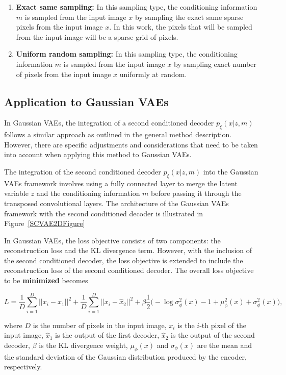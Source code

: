 \begin{enumerate}
    \item \textbf{Exact same sampling:} In this sampling type, the conditioning information $m$ is sampled from the input image $x$ by sampling the exact same sparse pixels from the input image $x$. In this work, the pixels that will be sampled from the input image will be a sparse grid of pixels.
    \item \textbf{Uniform random sampling:} In this sampling type, the conditioning information $m$ is sampled from the input image $x$ by sampling exact number of pixels from the input image $x$ uniformly at random.
\end{enumerate}

\subsection{Application to Gaussian VAEs}

In Gaussian VAEs, the integration of a second conditioned decoder
$p_\xi(x|z,m)$ follows a similar approach as outlined in the general method
description. However, there are specific adjustments and considerations that
need to be taken into account when applying this method to Gaussian VAEs.

The integration of the second conditioned decoder $p_\xi(x|z,m)$ into the
Gaussian VAEs framework involves using a fully connected layer to merge the
latent variable $z$ and the conditioning information $m$ before passing it
through the transposed convolutional layers. The architecture of the Gaussian
VAEs framework with the second conditioned decoder is illustrated in
Figure~\ref{SCVAE2DFigure}

In Gaussian VAEs, the loss objective consists of two components: the
reconstruction loss and the KL divergence term. However, with the inclusion of
the second conditioned decoder, the loss objective is extended to include the
reconstruction loss of the second conditioned decoder. The overall loss
objective to be \textbf{minimized} becomes

\[ L = \frac{1}{D} \sum_{i=1}^{D} ||x_i - \hat{x}_1 ||^2 + \frac{1}{D} \sum_{i=1}^{D} || x_i - \hat{x}_2 ||^2 + \beta  \frac{1}{2} \biggl( -\log \sigma^2_\phi(x) - 1 + \mu^2_\phi(x) + \sigma^2_\phi(x) \biggr), \]

where $D$ is the number of pixels in the input image, $x_i$ is the $i$-th pixel
of the input image, $\hat{x}_1$ is the output of the first decoder, $\hat{x}_2$
is the output of the second decoder, $\beta$ is the KL divergence weight,
$\mu_\phi(x)$ and $\sigma_\phi(x)$ are the mean and the standard deviation of
the Gaussian distribution produced by the encoder, respectively.

